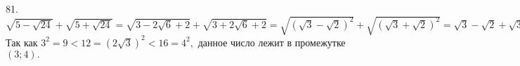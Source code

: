 81. $\sqrt{5-\sqrt{24}}+\sqrt{5+\sqrt{24}}=\sqrt{3-2\sqrt{6}+2}+\sqrt{3+2\sqrt{6}+2}=\sqrt{(\sqrt{3}-\sqrt{2})^2}+\sqrt{(\sqrt{3}+\sqrt{2})^2}=
\sqrt{3}-\sqrt{2}+\sqrt{3}+\sqrt{2}=2\sqrt{3}.$ Так как $3^2=9<12=(2\sqrt{3})^2<16=4^2,$ данное число лежит в промежутке $(3;4).$\\

